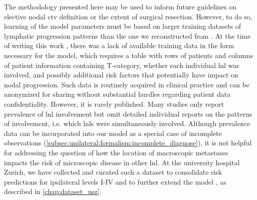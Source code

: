 \documentclass[\relativeRoot/main.tex]{subfiles}
\begin{document}
The methodology presented here may be used to inform future guidelines on elective nodal \gls{ctv} definition or the extent of surgical resection. However, to do so, learning of the model parameters must be based on larger training datasets of lymphatic progression patterns than the one we reconstructed from \cite{sanguineti_defining_2009}. At the time of writing this work \cite{ludwig_hidden_2021}, there was a lack of available training data in the form necessary for the model, which requires a table with rows of patients and columns of patient information containing T-category, whether each individual \gls{lnl} was involved, and possibly additional risk factors that potentially have impact on nodal progression. Such data is routinely acquired in clinical practice and can be anonymized for sharing without substantial hurdles regarding patient data confidentiality. However, it is rarely published. Many studies only report prevalence of \gls{lnl} involvement \cite{lindberg_distribution_1972,woolgar_histological_1999,candela_patterns_1990,vauterin_patterns_2006,ho_patterns_2012,shah_patterns_1990,razfar_incidence_2009,woolgar_topography_2007,chung_pattern_2016} but omit detailed individual reports on the patterns of involvement, i.e. which \glspl{lnl} were simultaneously involved. Although prevalence data can be incorporated into our model as a special case of incomplete observations (\cref{subsec:unilateral:formalism:incomplete_diagnose}), it is not helpful for addressing the question of how the location of macroscopic metastases impacts the risk of microscopic disease in other \gls{lnl}. At the university hospital Zurich, we have collected and curated such a dataset to consolidate risk predictions for ipsilateral levels I-IV and to further extend the model \cite{ludwig_detailed_2021,ludwig_dataset_2021}, as described in \cref{chap:dataset_usz}.
\end{document}
